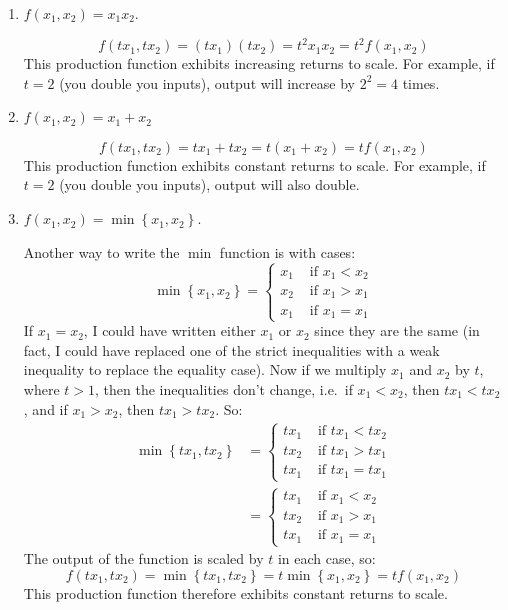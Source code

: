 \documentclass[12pt]{article}
\newcounter{question}[section]
\newenvironment{subquestions}{
  \begin{enumerate}[label=(\roman*)]}{\end{enumerate}}
\begin{document}
\begin{subquestions}
  \item $f\left( x_1,x_2 \right)=x_1x_2$.

    \textcolor{solution-color}{
      \[
        f\left( tx_1,tx_2 \right)=\left( tx_1 \right)\left( tx_2
        \right)=t^2x_1x_2=t^2 f\left( x_1,x_2 \right)
      \]
      This production function exhibits increasing returns to scale. For
      example, if $t=2$ (you double you inputs), output will increase by
      $2^2=4$ times.
    }
  \item $f\left( x_1,x_2 \right)=x_1 + x_2$

    \textcolor{solution-color}{
      \[
        f\left( tx_1,tx_2 \right)=tx_1 + tx_2 =t\left( x_1+x_2
        \right)=tf\left( x_1,x_2 \right)
      \]
      This production function exhibits constant returns to scale. For
      example, if $t=2$ (you double you inputs), output will also double.
    }
  \item $f\left( x_1,x_2 \right)=\min\left\{ x_1, x_2 \right\}$.

    \textcolor{solution-color}{
      Another way to write the $\min$ function is with cases:
      \[
        \min\left\{ x_1,x_2 \right\}=\begin{cases} x_1 & \text{ if } x_1 < x_2 \\
          x_2 & \text{ if } x_1 > x_1 \\
          x_1 & \text{ if } x_1 = x_1
        \end{cases}
      \]
      If $x_1=x_2$, I could have written either $x_1$ or $x_2$ since they are the same (in fact, I could have replaced one of the strict inequalities with a weak inequality to replace the equality case). Now if we multiply $x_1$ and $x_2$ by $t$, where $t>1$, then the inequalities don't change, i.e.~if $x_1<x_2$, then $tx_1<tx_2$, and if $x_1>x_2$, then $tx_1>tx_2$. So:
      \begin{align*}
        \min\left\{ tx_1,tx_2 \right\}&=
        \begin{cases} tx_1 & \text{ if } tx_1 < tx_2 \\
          tx_2 & \text{ if } tx_1 > tx_1 \\
          tx_1 & \text{ if } tx_1 = tx_1
        \end{cases} \\
 &=     \begin{cases} tx_1 & \text{ if } x_1 < x_2 \\
          tx_2 & \text{ if } x_1 > x_1 \\
          tx_1 & \text{ if } x_1 = x_1
        \end{cases}
      \end{align*}
      The output of the function is scaled by $t$ in each case, so:
      \[
        f\left( tx_1,tx_2 \right)=\min\left\{ tx_1,tx_2 \right\}=t\min\left\{
        x_1,x_2 \right\}=tf\left( x_1,x_2 \right)
      \]
      This production function therefore exhibits constant returns to scale.
    }
    \medskip
\end{subquestions}
\end{document}
